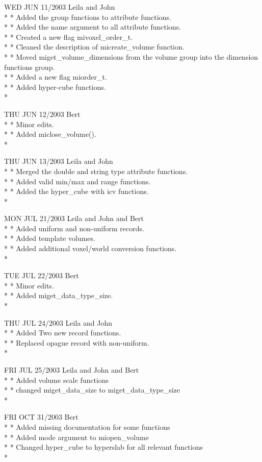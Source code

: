 \documentclass{article}
\begin{document}
WED  JUN 11/2003 Leila and John\\* 
* Added the group functions to attribute functions.\\*
* Added the name argument to all attribute functions.\\* 
* Created a new flag mivoxel\_order\_t.\\* 
* Cleaned the description of micreate\_volume function.\\*
* Moved miget\_volume\_dimensions from the volume group into the dimension functions group.\\*
* Added a new flag miorder\_t.\\*
* Added hyper-cube functions.\\*

THU  JUN 12/2003 Bert\\*
* Minor edits.\\*
* Added miclose\_volume().\\*

THU  JUN 13/2003 Leila and John\\*
* Merged the double and string type attribute functions.\\*
* Added valid min/max and range functions.\\*
* Added the hyper\_cube with icv functions.\\*

MON  JUL 21/2003 Leila and John and Bert\\*
* Added uniform and non-uniform records.\\*
* Added template volumes.\\*
* Added additional voxel/world conversion functions.\\*

TUE  JUL 22/2003 Bert\\*
* Minor edits.\\*
* Added miget\_data\_type\_size.\\*

THU  JUL 24/2003 Leila and John\\*
* Added Two new record functions.\\*
* Replaced opague record with non-uniform.\\*

FRI  JUL 25/2003 Leila and John and Bert\\*
* Added volume scale functions\\*
* changed miget\_data\_size to miget\_data\_type\_size\\*

FRI  OCT 31/2003 Bert\\*
* Added missing documentation for some functions\\*
* Added mode argument to miopen\_volume\\*
* Changed hyper_cube to hyperslab for all relevant functions\\*
\end{document}
